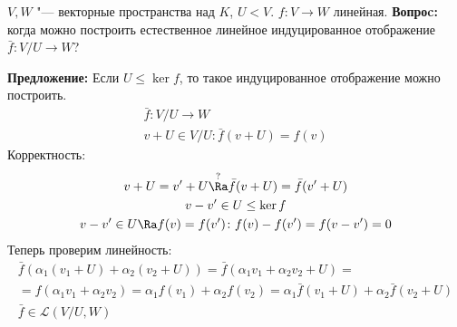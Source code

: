 $V, W$ "--- векторные пространства над $K$, $U < V$.
$f \colon V \to W$ линейная.
\textbf{Вопроc:} когда можно построить естественное линейное индуцированное отображение $\bar f\colon V/U \to W$?

\textbf{Предложение:} Если $U \le \ker f$, то такое индуцированное отображение можно построить.
\begin{gather*}
	\bar f \colon V/U \to W \\
	v + U \in V/U\colon \bar f(v + U) = f(v)
\end{gather*}
Корректность:
\begin{gather*}
	v + U = v' + U \overset{?}{\Ra} \bar f(v + U) = \bar f (v' + U) \\
	v - v' \in U \le \ker f \\
	v - v' \in U \Ra f(v) = f(v')\colon f(v) - f(v') = f(v - v') = 0 \\
\end{gather*}
Теперь проверим линейность:
\begin{gather*}
	\bar f\left(\alpha_1(v_1 + U) + \alpha_2(v_2 + U)\right) = \bar f\left(\alpha_1 v_1 + \alpha_2 v_2 + U\right) = \\
	= f(\alpha_1 v_1 + \alpha_2 v_2) = \alpha_1 f(v_1) + \alpha_2 f(v_2) = \alpha_1 \bar f(v_1 + U) + \alpha_2\bar f(v_2 + U) \\
	\bar f \in \mathcal{L}(V/U, W)
\end{gather*}